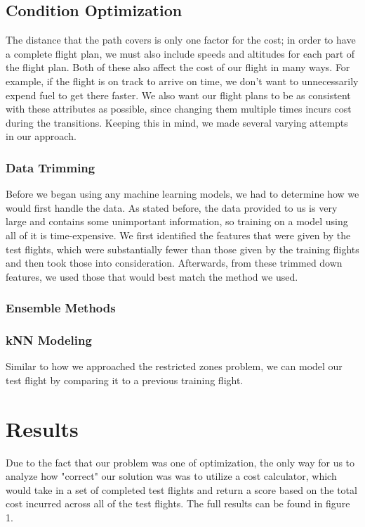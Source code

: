 \documentclass{article}[12pt]
\begin{document}
\begin{multicols}{2}
\subsection{Condition Optimization}
The distance that the path covers is only one factor for the cost; in order to have a complete flight plan, we must also include speeds and altitudes for each part of the flight plan. Both of these also affect the cost of our flight in many ways. For example, if the flight is on track to arrive on time, we don't want to unnecessarily expend fuel to get there faster. We also want our flight plans to be as consistent with these attributes as possible, since changing them multiple times incurs cost during the transitions. Keeping this in mind, we made several varying attempts in our approach. 

\subsubsection{Data Trimming}

Before we began using any machine learning models, we had to determine how we would first handle the data. As stated before, the data provided to us is very large and contains some unimportant information, so training on a model using all of it is time-expensive. We first identified the features that were given by the test flights, which were substantially fewer than those given by the training flights and then took those into consideration. Afterwards, from these trimmed down features, we used those that would best match the method we used. 

\subsubsection{Ensemble Methods}
\subsubsection{kNN Modeling}

Similar to how we approached the restricted zones problem, we can model our test flight by comparing it to a previous training flight. 

\section{Results}
Due to the fact that our problem was one of optimization, the only way for us to analyze how "correct" our solution was was to utilize a cost calculator, which would take in a set of completed test flights and return a score based on the total cost incurred across all of the test flights. The full results can be found in figure 1. 


\end{multicols}
\end{document}
